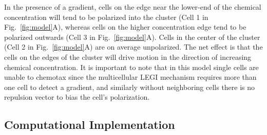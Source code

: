 In the presence of a gradient, cells on the edge near the lower-end of the chemical concentration will tend to be polarized into the cluster (Cell 1 in Fig.\ \ref{fig:model}A), whereas cells on the higher concentration edge tend to be polarized outwards (Cell 3 in Fig.\ \ref{fig:model}A). Cells in the center of the cluster (Cell 2 in Fig.\ \ref{fig:model}A) are on average unpolarized. The net effect is that the cells on the edges of the cluster will drive motion in the direction of increasing chemical concentration. It is important to note that in this model single cells are unable to chemotax since the multicellular LEGI mechanism requires more than one cell to detect a gradient, and similarly without neighboring cells there is no repulsion vector to bias the cell's polarization.


\subsection{Computational Implementation}


